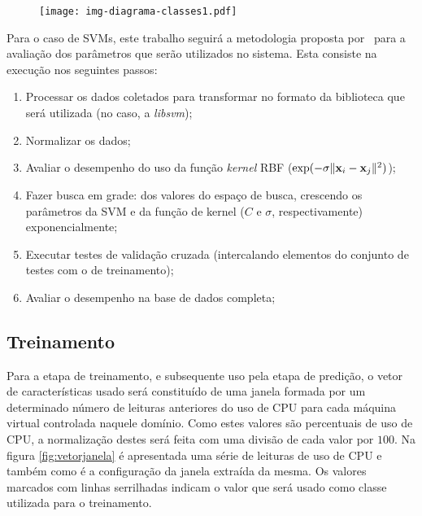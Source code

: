 \begin{figure}[htp]
\centering
\texttt{[image: img-diagrama-classes1.pdf]}
\label{fig:diagramaclasses1}
\end{figure}


Para o caso de SVMs, este trabalho seguirá a metodologia proposta
por~ para a avaliação dos parâmetros que serão
utilizados no sistema. Esta consiste na execução nos seguintes passos:
\begin{enumerate}
  \item Processar os dados coletados para transformar no formato da biblioteca
        que será utilizada (no caso, a \emph{libsvm});
  \item Normalizar os dados;
  \item Avaliar o desempenho do uso da função \emph{kernel} RBF
        ($\exp(-\sigma\lVert \mathbf{x}_i-\mathbf{x}_j \rVert^2)$);
  \item Fazer busca em grade: dos valores do espaço de busca, crescendo os
	 parâmetros da SVM e da função de kernel ($C$ e $\sigma$,
         respectivamente) exponencialmente;
  \item Executar testes de validação cruzada (intercalando elementos do conjunto
        de testes com o de treinamento);
  \item Avaliar o desempenho na base de dados completa;
\end{enumerate}

\subsection{Treinamento}

Para a etapa de treinamento, e subsequente uso pela etapa de predição, o
vetor de características usado será constituído de uma janela
formada por um determinado número de leituras anteriores do uso de CPU para
cada máquina virtual controlada naquele domínio. Como estes valores são
percentuais de uso de CPU, a normalização destes será feita com uma divisão
de cada valor por $100$. Na figura \ref{fig:vetorjanela} é apresentada uma
série de leituras de uso de CPU e também como é a configuração da janela
extraída da mesma. Os valores marcados com linhas serrilhadas indicam o valor
que será usado como classe utilizada para o treinamento.

